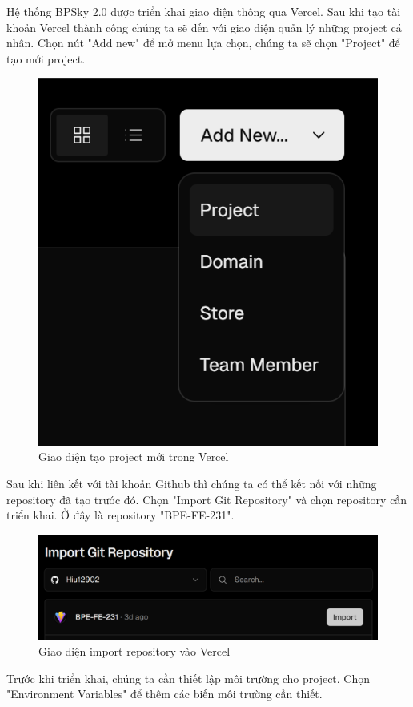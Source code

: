 Hệ thống BPSky 2.0 được triển khai giao diện thông qua Vercel. Sau khi tạo tài khoản Vercel thành công chúng ta sẽ đến với giao diện quản lý những project cá nhân. Chọn nút "Add new" để mở menu lựa chọn, chúng ta sẽ chọn "Project" để tạo mới project.

\begin{figure}[H]
    \centering
    \includegraphics[width=0.5\linewidth]{Content/Hiện thực hệ thống/images/createProjectVercel.png}
    \vspace{0.5cm}
    \caption{Giao diện tạo project mới trong Vercel}
    \label{fig:Tạo project mới trong Vercel}
\end{figure}

Sau khi liên kết với tài khoản Github thì chúng ta có thể kết nối với những repository đã tạo trước đó. Chọn "Import Git Repository" và chọn repository cần triển khai. Ở đây là repository "BPE-FE-231".

\begin{figure}[H]
    \centering
    \includegraphics[width=0.5\linewidth]{Content/Hiện thực hệ thống/images/importRepoVercel.png}
    \vspace{0.5cm}
    \caption{Giao diện import repository vào Vercel}
    \label{fig:Import repository vào Vercel}
\end{figure}

Trước khi triển khai, chúng ta cần thiết lập môi trường cho project. Chọn "Environment Variables" để thêm các biến môi trường cần thiết.

